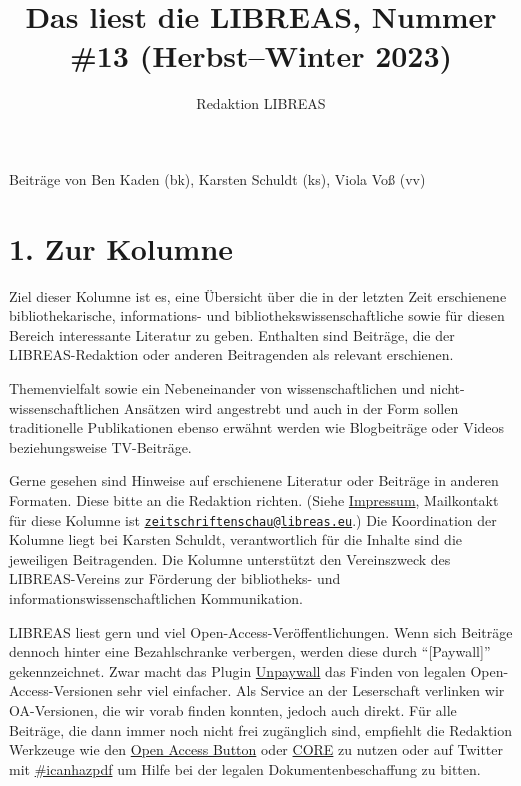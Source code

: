 \documentclass[a4paper,
fontsize=11pt,
oneside,
numbers=noperiodatend,
parskip=half-,
bibliography=totoc,
final
]{scrartcl}
\title{\LARGE{Das liest die LIBREAS, Nummer \#13 (Herbst–Winter 2023)}}%
\author{Redaktion LIBREAS} %
\date{}
\begin{document}
\maketitle
\thispagestyle{fancyplain} 


Beiträge von Ben Kaden (bk), Karsten Schuldt (ks), Viola Voß (vv)

\hypertarget{zur-kolumne}{%
\section{1. Zur Kolumne}\label{zur-kolumne}}

Ziel dieser Kolumne ist es, eine Übersicht über die in der letzten Zeit
erschienene bibliothekarische, informations- und
bibliothekswissenschaftliche sowie für diesen Bereich interessante
Literatur zu geben. Enthalten sind Beiträge, die der LIBREAS-Redaktion
oder anderen Beitragenden als relevant erschienen.

Themenvielfalt sowie ein Nebeneinander von wissenschaftlichen und
nicht-wissenschaftlichen Ansätzen wird angestrebt und auch in der Form
sollen traditionelle Publikationen ebenso erwähnt werden wie
Blogbeiträge oder Videos beziehungsweise TV-Beiträge.

Gerne gesehen sind Hinweise auf erschienene Literatur oder Beiträge in
anderen Formaten. Diese bitte an die Redaktion richten. (Siehe
\href{http://libreas.eu/about/}{Impressum}, Mailkontakt für diese
Kolumne ist
\href{mailto:zeitschriftenschau@libreas.eu}{\nolinkurl{zeitschriftenschau@libreas.eu}}.)
Die Koordination der Kolumne liegt bei Karsten Schuldt, verantwortlich
für die Inhalte sind die jeweiligen Beitragenden. Die Kolumne
unterstützt den Vereinszweck des LIBREAS-Vereins zur Förderung der
bibliotheks- und informationswissenschaftlichen Kommunikation.

LIBREAS liest gern und viel Open-Access-Veröffentlichungen. Wenn sich
Beiträge dennoch hinter eine Bezahlschranke verbergen, werden diese
durch \enquote{{[}Paywall{]}} gekennzeichnet. Zwar macht das Plugin
\href{http://unpaywall.org/}{Unpaywall} das Finden von legalen
Open-Access-Versionen sehr viel einfacher. Als Service an der
Leserschaft verlinken wir OA-Versionen, die wir vorab finden konnten,
jedoch auch direkt. Für alle Beiträge, die dann immer noch nicht frei
zugänglich sind, empfiehlt die Redaktion Werkzeuge wie den
\href{https://openaccessbutton.org/}{Open Access Button} oder
\href{https://core.ac.uk/services/discovery/}{CORE} zu nutzen oder auf
Twitter mit
\href{https://twitter.com/hashtag/icanhazpdf?src=hash}{\#icanhazpdf} um
Hilfe bei der legalen Dokumentenbeschaffung zu bitten.
\end{document}
